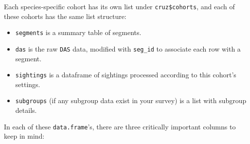 \documentclass[
]{book}
\newenvironment{Shaded}{\begin{snugshade}}{\end{snugshade}}
\newcommand{\AttributeTok}[1]{\textcolor[rgb]{0.77,0.63,0.00}{#1}}
\newcommand{\DecValTok}[1]{\textcolor[rgb]{0.00,0.00,0.81}{#1}}
\newcommand{\FloatTok}[1]{\textcolor[rgb]{0.00,0.00,0.81}{#1}}
\newcommand{\FunctionTok}[1]{\textcolor[rgb]{0.00,0.00,0.00}{#1}}
\newcommand{\NormalTok}[1]{#1}
\newcommand{\SpecialCharTok}[1]{\textcolor[rgb]{0.00,0.00,0.00}{#1}}
\begin{document}
\begin{Shaded}
\end{Shaded}

Each species-specific cohort has its own list under \texttt{cruz\$cohorts}, and each of these cohorts has the same list structure:

\begin{itemize}
\item
  \texttt{segments} is a summary table of segments.
\item
  \texttt{das} is the raw \texttt{DAS} data, modified with \texttt{seg\_id} to associate each row with a segment.
\item
  \texttt{sightings} is a dataframe of sightings processed according to this cohort's settings.
\item
  \texttt{subgroups} (if any subgroup data exist in your survey) is a list with subgroup details.
\end{itemize}

In each of these \texttt{data.frame}'s, there are three critically important columns to keep in mind:
\end{document}
